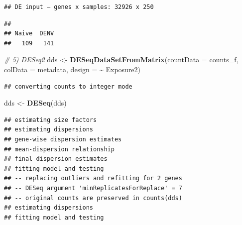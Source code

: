 \documentclass[
]{article}
\newenvironment{Shaded}{\begin{snugshade}}{\end{snugshade}}
\newcommand{\AttributeTok}[1]{\textcolor[rgb]{0.13,0.29,0.53}{#1}}
\newcommand{\CommentTok}[1]{\textcolor[rgb]{0.56,0.35,0.01}{\textit{#1}}}
\newcommand{\FunctionTok}[1]{\textcolor[rgb]{0.13,0.29,0.53}{\textbf{#1}}}
\newcommand{\NormalTok}[1]{#1}
\newcommand{\OtherTok}[1]{\textcolor[rgb]{0.56,0.35,0.01}{#1}}
\newcommand{\SpecialCharTok}[1]{\textcolor[rgb]{0.81,0.36,0.00}{\textbf{#1}}}
\begin{document}
\begin{verbatim}
## DE input — genes x samples: 32926 x 250
\end{verbatim}

\begin{Shaded}
\end{Shaded}

\begin{verbatim}
## 
## Naive  DENV 
##   109   141
\end{verbatim}

\begin{Shaded}
\begin{Highlighting}[]
\CommentTok{\# 5) DESeq2}
\NormalTok{dds }\OtherTok{\textless{}{-}} \FunctionTok{DESeqDataSetFromMatrix}\NormalTok{(}\AttributeTok{countData =}\NormalTok{ counts\_f,}
                              \AttributeTok{colData   =}\NormalTok{ metadata,}
                              \AttributeTok{design    =} \SpecialCharTok{\textasciitilde{}}\NormalTok{ Exposure2)}
\end{Highlighting}
\end{Shaded}

\begin{verbatim}
## converting counts to integer mode
\end{verbatim}

\begin{Shaded}
\begin{Highlighting}[]
\NormalTok{dds }\OtherTok{\textless{}{-}} \FunctionTok{DESeq}\NormalTok{(dds)}
\end{Highlighting}
\end{Shaded}

\begin{verbatim}
## estimating size factors
## estimating dispersions
## gene-wise dispersion estimates
## mean-dispersion relationship
## final dispersion estimates
## fitting model and testing
## -- replacing outliers and refitting for 2 genes
## -- DESeq argument 'minReplicatesForReplace' = 7 
## -- original counts are preserved in counts(dds)
## estimating dispersions
## fitting model and testing
\end{verbatim}
\end{document}
